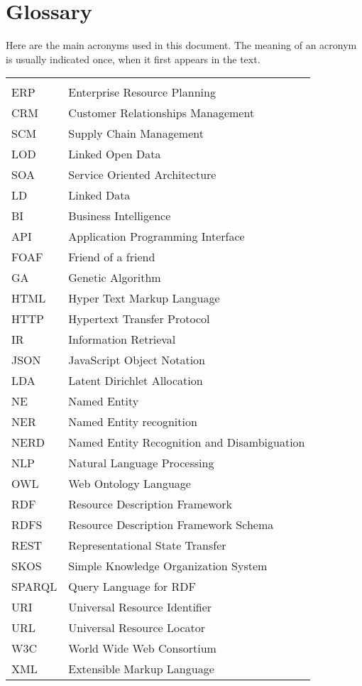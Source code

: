 \chapter*{Glossary}

Here are the main acronyms used in this document. The meaning of an acronym is usually indicated once, when it first appears in the text.

\begin{longtable}{lp{9cm}}
 &\\
 ERP &  Enterprise Resource Planning\\
 CRM & Customer Relationships Management\\
 SCM & Supply Chain Management\\
 LOD & Linked Open Data \\
 SOA & Service Oriented Architecture\\
 LD & Linked Data\\
 BI & Business Intelligence\\
 API  &   Application Programming Interface \\
 FOAF & Friend of a friend \\
 GA & Genetic Algorithm \\
 HTML &   Hyper Text Markup Language\\
 HTTP & Hypertext Transfer Protocol \\
 IR & Information Retrieval \\
 JSON & JavaScript Object Notation \\
 LDA & Latent Dirichlet Allocation \\
 NE & Named Entity \\
 NER & Named Entity recognition\\
 NERD & Named Entity Recognition and Disambiguation \\
 NLP & Natural Language Processing \\
 OWL &  Web Ontology Language \\
 RDF  & Resource Description Framework\\
 RDFS & Resource Description Framework Schema \\
 REST & Representational State Transfer\\
 SKOS &  Simple Knowledge Organization System \\
 SPARQL & Query Language for RDF \\
 URI & Universal Resource Identifier \\
 URL & Universal Resource Locator \\
 W3C & World Wide Web Consortium \\
 XML & Extensible Markup Language
\end{longtable}

